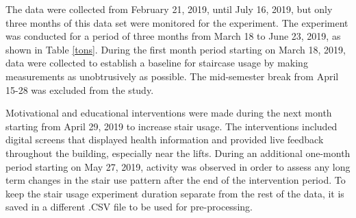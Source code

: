 



The data were collected from February 21, 2019, until July 16, 2019, but only three months of this data set were monitored for the experiment. The experiment was conducted for a period of three months from March 18 to June 23, 2019, as shown in Table \ref{tons}. During the first month period starting on March 18, 2019, data were collected to establish a baseline for staircase usage by making measurements as unobtrusively as possible. The mid-semester break from April 15-28 was excluded from the study. 

Motivational and educational interventions were made during the next month starting from April 29, 2019 to increase stair usage. The interventions included digital screens that displayed health information and provided live feedback throughout the building, especially near the lifts. During an additional one-month period starting on May 27, 2019, activity was observed in order to assess any long term changes in the stair use pattern after the end of the intervention period. To keep the stair usage experiment duration separate from the rest of the data, it is saved in a different .CSV file to be used for pre-processing. 


